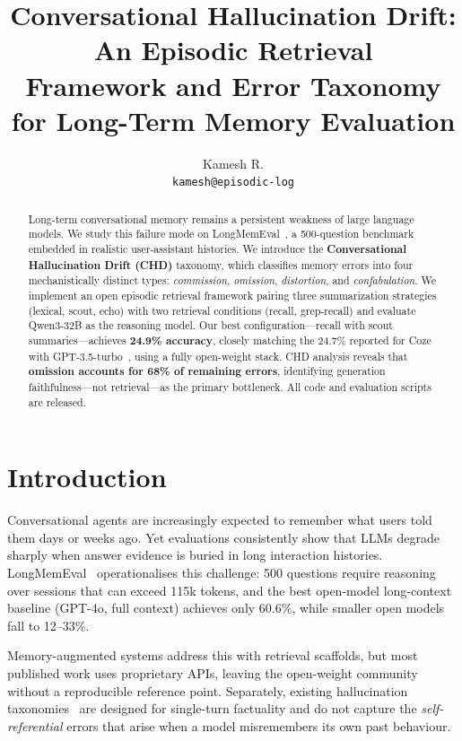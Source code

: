 \documentclass[11pt,twocolumn]{article}
\title{\textbf{Conversational Hallucination Drift: An Episodic Retrieval\\
Framework and Error Taxonomy for Long-Term Memory Evaluation}}
\author{
  Kamesh R. \\
  \small{\texttt{kamesh@episodic-log}}
}
\date{}
\begin{document}
\maketitle
\thispagestyle{empty}

\begin{abstract}
Long-term conversational memory remains a persistent weakness of large
language models. We study this failure mode on LongMemEval~\cite{wu2025longmemeval},
a 500-question benchmark embedded in realistic user-assistant histories.
We introduce the \textbf{Conversational Hallucination Drift (CHD)} taxonomy, which
classifies memory errors into four mechanistically distinct types:
\textit{commission}, \textit{omission}, \textit{distortion}, and
\textit{confabulation}. We implement an open episodic retrieval
framework pairing three summarization strategies (lexical, scout,
echo) with two retrieval conditions (recall, grep-recall) and evaluate
Qwen3-32B as the reasoning model. Our best configuration---recall
with scout summaries---achieves \textbf{24.9\% accuracy}, closely matching
the 24.7\% reported for Coze with GPT-3.5-turbo~\cite{wu2025longmemeval},
using a fully open-weight stack. CHD analysis reveals that \textbf{omission
accounts for 68\% of remaining errors}, identifying generation
faithfulness---not retrieval---as the primary bottleneck. All code
and evaluation scripts are released.
\end{abstract}

\section{Introduction}

Conversational agents are increasingly expected to remember what users
told them days or weeks ago. Yet evaluations consistently show that
LLMs degrade sharply when answer evidence is buried in long interaction
histories. LongMemEval~\cite{wu2025longmemeval} operationalises this
challenge: 500 questions require reasoning over sessions that can
exceed 115k tokens, and the best open-model long-context baseline
(GPT-4o, full context) achieves only 60.6\%, while smaller open
models fall to 12--33\%.

Memory-augmented systems address this with retrieval scaffolds, but
most published work uses proprietary APIs, leaving the open-weight
community without a reproducible reference point. Separately, existing
hallucination taxonomies~\cite{li2023halueval,maynez2020faithfulness}
are designed for single-turn factuality and do not capture the
\emph{self-referential} errors that arise when a model misremembers
its own past behaviour.
\end{document}
